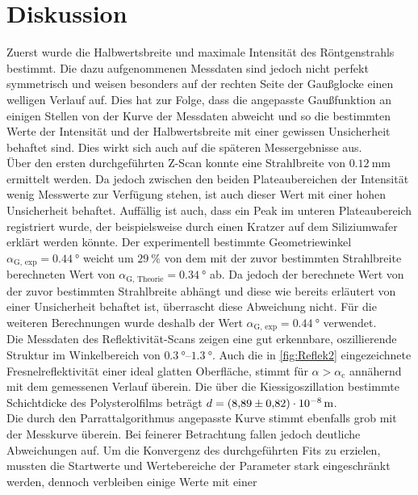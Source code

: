 \section{Diskussion}
\label{sec:Diskussion}
Zuerst wurde die Halbwertsbreite und maximale Intensität des Röntgenstrahls bestimmt. Die dazu aufgenommenen Messdaten sind jedoch nicht perfekt symmetrisch und weisen 
besonders auf der rechten Seite der Gaußglocke einen welligen Verlauf auf. Dies hat zur Folge, dass die angepasste Gaußfunktion an einigen Stellen von der Kurve der 
Messdaten abweicht und so die bestimmten Werte der Intensität und der Halbwertsbreite mit einer gewissen Unsicherheit behaftet sind. Dies wirkt sich auch auf die späteren
Messergebnisse aus.\\
Über den ersten durchgeführten Z-Scan konnte eine  Strahlbreite von $\qty{0.12}{\milli\metre}$ ermittelt werden. Da jedoch zwischen den beiden Plateaubereichen der Intensität 
wenig Messwerte zur Verfügung stehen, ist auch dieser Wert mit einer hohen Unsicherheit behaftet. Auffällig ist auch, dass ein Peak im unteren Plateaubereich registriert wurde,
der beispielsweise durch einen Kratzer auf dem Siliziumwafer erklärt werden könnte. 
Der experimentell bestimmte Geometriewinkel $\alpha_\text{G, exp} = \qty{0.44}{\degree}$ weicht um $\qty{29}{\percent}$ von dem mit der zuvor bestimmten Strahlbreite 
berechneten Wert von $\alpha_\text{G, Theorie} = \qty{0.34}{\degree}$ ab. Da jedoch der berechnete Wert von der zuvor bestimmten Strahlbreite abhängt und diese wie bereits 
erläutert von einer Unsicherheit behaftet ist, überrascht diese Abweichung nicht. Für die weiteren Berechnungen wurde deshalb der Wert 
$\alpha_\text{G, exp} = \qty{0.44}{\degree}$ verwendet. \\
Die Messdaten des Reflektivität-Scans zeigen eine gut erkennbare, oszillierende Struktur im Winkelbereich von $\qtyrange{0.3}{1.3}{\degree}$. Auch die in \autoref{fig:Reflek2}
eingezeichnete Fresnelreflektivität einer ideal glatten Oberfläche, stimmt für $\alpha > \alpha_\text{c}$ annähernd mit dem gemessenen Verlauf überein. Die über die 
Kiessigoszillation bestimmte Schichtdicke des Polysterolfilms beträgt $d = \qty{8.89 +- 0.82e-8}{\metre}$.\\
Die durch den Parrattalgorithmus angepasste Kurve stimmt ebenfalls grob mit der Messkurve überein. Bei feinerer Betrachtung fallen jedoch deutliche Abweichungen auf.
Um die Konvergenz des durchgeführten Fits zu erzielen, mussten die Startwerte und Wertebereiche der Parameter stark eingeschränkt werden, dennoch verbleiben einige Werte mit einer 
